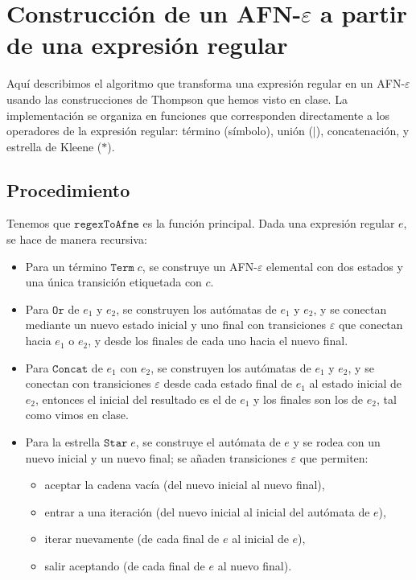 
\section{Construcción de un AFN-$\varepsilon$ a partir de una expresión regular}

Aquí describimos el algoritmo que transforma una expresión regular en un AFN-$\varepsilon$ usando las construcciones de Thompson que hemos visto en clase. La implementación se organiza en funciones que corresponden directamente a los operadores de la expresión regular: término (símbolo), unión (\(|\)), concatenación, y estrella de Kleene (\(*\)).

\subsection{Procedimiento}

Tenemos que $\texttt{regexToAfne}$ es la función principal. Dada una expresión regular $e$, se hace de manera recursiva:
\begin{itemize}
    \item Para un término $\texttt{Term}\;c$, se construye un AFN-$\varepsilon$ elemental con dos estados y una única transición etiquetada con $c$.
    \item Para $\texttt{Or}$ de $e_1$ y $e_2$, se construyen los autómatas de $e_1$ y $e_2$, y se conectan mediante un nuevo estado inicial y uno final con transiciones $\varepsilon$ que conectan hacia $e_1$ o $e_2$, y desde los finales de cada uno hacia el nuevo final.
    \item Para $\texttt{Concat}$ de $e_1$ con $e_2$, se construyen los autómatas de $e_1$ y $e_2$, y se conectan con transiciones $\varepsilon$ desde cada estado final de $e_1$ al estado inicial de $e_2$, entonces el inicial del resultado es el de $e_1$ y los finales son los de $e_2$, tal como vimos en clase.
    \item Para la estrella $\texttt{Star}\;e$, se construye el autómata de $e$ y se rodea con un nuevo inicial y un nuevo final; se añaden transiciones $\varepsilon$ que permiten:
    \begin{itemize}
        \item aceptar la cadena vacía (del nuevo inicial al nuevo final),
        \item entrar a una iteración (del nuevo inicial al inicial del autómata de $e$),
        \item iterar nuevamente (de cada final de $e$ al inicial de $e$),
        \item salir aceptando (de cada final de $e$ al nuevo final).
    \end{itemize}
\end{itemize}

